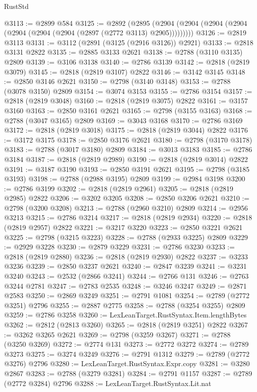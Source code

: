 \begin{lexlean}{RustStd}
\begin{coremodule}
@3113 := @2899 @584
@3125 := @2892
    (@2895 (@2904 (@2904 (@2904 (@2904 (@2904 (@2904 (@2904 (@2897 (@2772 @3113) @2905)))))))))
@3126 := @2819 @3113
@3131 := @3112 (@2891 (@3125 (@2916 @3126)) @2921)
@3133 := @2818 @3131 @2822
@3135 := @2885 @3133 @2621
@3138 := @2788 (@3110 @3135) @2809
@3139 := @3106 @3138
@3140 := @2786 @3139
@3142 := @2818 (@2819 @3079)
@3145 := @2818 (@2819 @3107) @2822
@3146 := @3142 @3145
@3148 := @2850 @3146 @2621
@3150 := @2798 (@3140 @3148)
@3153 := @2788 (@3078 @3150) @2809
@3154 := @3074 @3153
@3155 := @2786 @3154
@3157 := @2818 (@2819 @3048)
@3160 := @2818 (@2819 @3075) @2822
@3161 := @3157 @3160
@3163 := @2850 @3161 @2621
@3165 := @2798 (@3155 @3163)
@3168 := @2788 (@3047 @3165) @2809
@3169 := @3043 @3168
@3170 := @2786 @3169
@3172 := @2818 (@2819 @3018)
@3175 := @2818 (@2819 @3044) @2822
@3176 := @3172 @3175
@3178 := @2850 @3176 @2621
@3180 := @2798 (@3170 @3178)
@3183 := @2788 (@3017 @3180) @2809
@3184 := @3013 @3183
@3185 := @2786 @3184
@3187 := @2818 (@2819 @2989)
@3190 := @2818 (@2819 @3014) @2822
@3191 := @3187 @3190
@3193 := @2850 @3191 @2621
@3195 := @2798 (@3185 @3193)
@3198 := @2788 (@2988 @3195) @2809
@3199 := @2984 @3198
@3200 := @2786 @3199
@3202 := @2818 (@2819 @2961)
@3205 := @2818 (@2819 @2985) @2822
@3206 := @3202 @3205
@3208 := @2850 @3206 @2621
@3210 := @2798 (@3200 @3208)
@3213 := @2788 (@2960 @3210) @2809
@3214 := @2956 @3213
@3215 := @2786 @3214
@3217 := @2818 (@2819 @2934)
@3220 := @2818 (@2819 @2957) @2822
@3221 := @3217 @3220
@3223 := @2850 @3221 @2621
@3225 := @2798 (@3215 @3223)
@3228 := @2788 (@2933 @3225) @2809
@3229 := @2929 @3228
@3230 := @2879 @3229
@3231 := @2786 @3230
@3233 := @2818 (@2819 @2880)
@3236 := @2818 (@2819 @2930) @2822
@3237 := @3233 @3236
@3239 := @2850 @3237 @2621
@3240 := @2847 @3239
@3241 := @3231 @3240
@3243 := @2532 (@2866 @3241)
@3244 := @2766 @131
@3246 := @2763 @3244 @2781
@3247 := @2783 @2535
@3248 := @3246 @3247
@3249 := @2871 @2583
@3250 := @2869 @3249
@3251 := @2791 @1081
@3254 := @2789 (@2772 @3251) @2796
@3255 := @2887 @2775
@3258 := @2788 (@3254 @3255) @2809
@3259 := @2786 @3258
@3260 := LexLeanTarget.RustSyntax.Item.lengthBytes
@3262 := @2812 (@2813 @3260)
@3265 := @2818 (@2819 @3251) @2822
@3267 := @3262 @3265 @2621
@3269 := @2798 (@3259 @3267)
@3271 := @2788 (@3250 @3269)
@3272 := @2774 @131
@3273 := @2772 @3272
@3274 := @2789 @3273
@3275 := @3274 @3249
@3276 := @2791 @1312
@3279 := @2789 (@2772 @3276) @2796
@3280 := LexLeanTarget.RustSyntax.Expr.copy
@3281 := @3280 @2867
@3283 := @2788 (@3279 @3281)
@3284 := @2791 @1157
@3287 := @2789 (@2772 @3284) @2796
@3288 := LexLeanTarget.RustSyntax.Lit.nat

\end{coremodule}
\end{lexlean}
